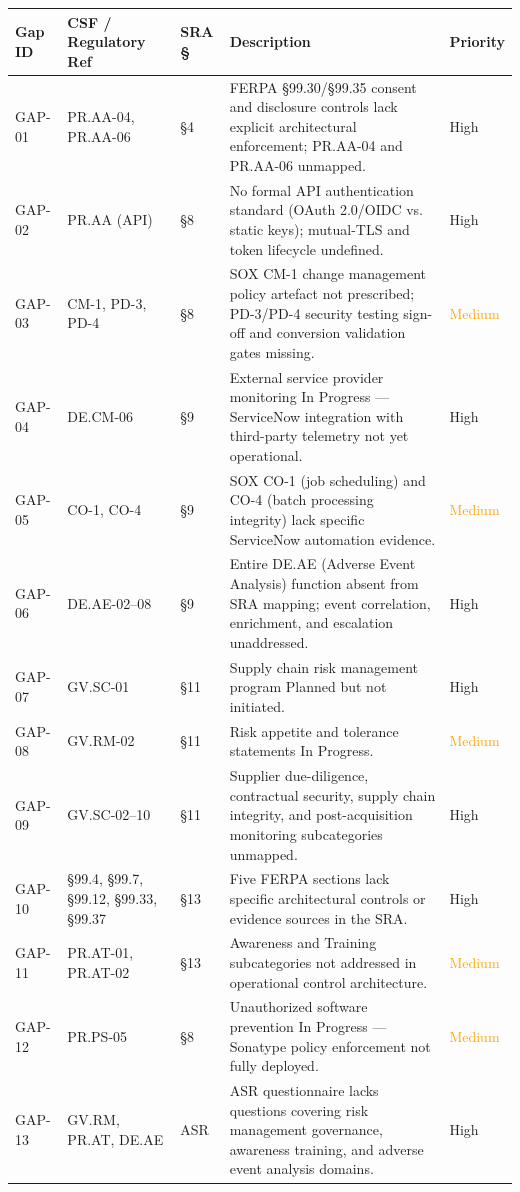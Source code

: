 \documentclass[11pt,landscape]{article}
\begin{document}
\begin{longtable}{lp{1.2in}lp{3.5in}l}
\toprule
\textbf{Gap ID} & \textbf{CSF / Regulatory Ref} & \textbf{SRA §} & \textbf{Description} & \textbf{Priority} \\
\midrule
\endhead
GAP-01 & PR.AA-04, PR.AA-06 & §4 & FERPA §99.30/§99.35 consent and disclosure controls lack explicit architectural enforcement; PR.AA-04 and PR.AA-06 unmapped. & \textcolor{gapred}{High} \\
GAP-02 & PR.AA (API) & §8 & No formal API authentication standard (OAuth 2.0/OIDC vs. static keys); mutual-TLS and token lifecycle undefined. & \textcolor{gapred}{High} \\
GAP-03 & CM-1, PD-3, PD-4 & §8 & SOX CM-1 change management policy artefact not prescribed; PD-3/PD-4 security testing sign-off and conversion validation gates missing. & \textcolor{orange}{Medium} \\
GAP-04 & DE.CM-06 & §9 & External service provider monitoring In Progress — ServiceNow integration with third-party telemetry not yet operational. & \textcolor{gapred}{High} \\
GAP-05 & CO-1, CO-4 & §9 & SOX CO-1 (job scheduling) and CO-4 (batch processing integrity) lack specific ServiceNow automation evidence. & \textcolor{orange}{Medium} \\
GAP-06 & DE.AE-02–08 & §9 & Entire DE.AE (Adverse Event Analysis) function absent from SRA mapping; event correlation, enrichment, and escalation unaddressed. & \textcolor{gapred}{High} \\
GAP-07 & GV.SC-01 & §11 & Supply chain risk management program Planned but not initiated. & \textcolor{gapred}{High} \\
GAP-08 & GV.RM-02 & §11 & Risk appetite and tolerance statements In Progress. & \textcolor{orange}{Medium} \\
GAP-09 & GV.SC-02–10 & §11 & Supplier due-diligence, contractual security, supply chain integrity, and post-acquisition monitoring subcategories unmapped. & \textcolor{gapred}{High} \\
GAP-10 & §99.4, §99.7, §99.12, §99.33, §99.37 & §13 & Five FERPA sections lack specific architectural controls or evidence sources in the SRA. & \textcolor{gapred}{High} \\
GAP-11 & PR.AT-01, PR.AT-02 & §13 & Awareness and Training subcategories not addressed in operational control architecture. & \textcolor{orange}{Medium} \\
GAP-12 & PR.PS-05 & §8 & Unauthorized software prevention In Progress — Sonatype policy enforcement not fully deployed. & \textcolor{orange}{Medium} \\
GAP-13 & GV.RM, PR.AT, DE.AE & ASR & ASR questionnaire lacks questions covering risk management governance, awareness training, and adverse event analysis domains. & \textcolor{gapred}{High} \\
\bottomrule
\end{longtable}
\end{document}
